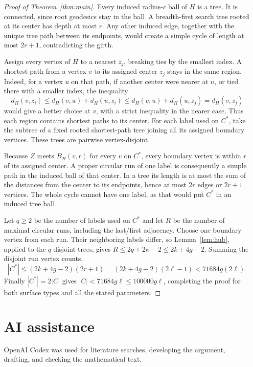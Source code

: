 \documentclass[11pt]{article}
\theoremstyle{remark}
\begin{document}
\begin{proof}[Proof of Theorem~\ref{thm:main}]
Every induced radius-$r$ ball of $H$ is a tree. It is connected, since
root geodesics stay in the ball. A breadth-first search tree rooted at
its center has depth at most $r$. Any other induced edge, together with
the unique tree path between its endpoints, would create a simple cycle
of length at most $2r+1$, contradicting the girth.

Assign every vertex of $H$ to a nearest $z_j$, breaking ties by the
smallest index. A shortest path from a vertex $v$ to its assigned center
$z_j$ stays in the same region. Indeed, for a vertex $u$ on that path,
if another center were nearer at $u$, or tied there with a smaller index,
the inequality
\[
d_H(v,z_i)\le d_H(v,u)+d_H(u,z_i)
 \le d_H(v,u)+d_H(u,z_j)=d_H(v,z_j)
\]
would give a better choice at $v$, with a strict inequality in the
nearer case. Thus each region contains shortest paths to its center.
For each label used on $C^*$, take the subtree of a fixed rooted
shortest-path tree joining all its assigned boundary vertices.
These trees are pairwise vertex-disjoint.

Because $Z$ meets $B_H(v,r)$ for every $v$ on $C^*$, every boundary
vertex is within $r$ of its assigned center. A proper circular run of
one label is consequently a simple path in the induced ball of that
center. In a tree its length is at most the sum of the distances from
the center to its endpoints, hence at most $2r$ edges or $2r+1$ vertices.
The whole cycle cannot have one label, as that would put $C^*$ in an
induced tree ball.

Let $q\ge2$ be the number of labels used on $C^*$ and let $R$ be the
number of maximal circular runs, including the last/first adjacency.
Choose one boundary vertex from each run. Their neighboring labels
differ, so Lemma~\ref{lem:hub}, applied to the $q$ disjoint trees, gives
$R\le2q+2\kappa-2\le2k+4g-2$. Summing the disjoint run vertex counts,
\[
|C^*|\le(2k+4g-2)(2r+1)
 =(2k+4g-2)(2\ell-1)<71684g(2\ell).
\]
Finally $|C^*|=2|C|$ gives $|C|<71684g\ell\le100000g\ell$, completing
the proof for both surface types and all the stated parameters.
\end{proof}

\section*{AI assistance}
OpenAI Codex was used for literature searches, developing the argument,
drafting, and checking the mathematical text.
\end{document}
